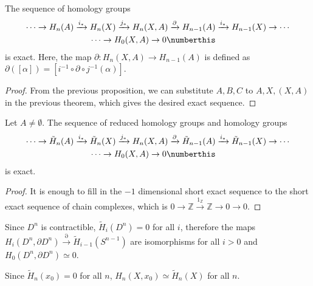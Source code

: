 \begin{cor} The sequence of homology groups
\begin{align*}
\cdots\rightarrow H_n(A)\xrightarrow{i_*} H_n(X)\xrightarrow{j_*} H_n(X,A)\xrightarrow{\partial} H_{n-1}(A)&\xrightarrow{i_*}H_{n-1}(X)\rightarrow\cdots\\
\cdots\rightarrow H_0(X,A)\rightarrow 0\numberthis
\end{align*}
is exact. Here, the map $\partial:H_n(X,A)\rightarrow H_{n-1}(A)$ is defined as $\partial([\alpha])=[i^{-1}\circ \partial\circ j^{-1}(\alpha)]$.
\end{cor}
\begin{proof}
From the previous proposition, we can substitute $A,B,C$ to $A,X,(X,A)$ in the previous theorem, which gives the desired exact sequence.
\end{proof}

\begin{cor} Let $A\neq \emptyset$. The sequence of reduced homology groups and homology groups
\begin{align*}
\cdots\rightarrow \tilde{H}_n(A)\xrightarrow{i_*} \tilde{H}_n(X)\xrightarrow{j_*} H_n(X,A)\xrightarrow{\partial} \tilde{H}_{n-1}(A)&\xrightarrow{i_*}\tilde{H}_{n-1}(X)\rightarrow\cdots\\
\cdots\rightarrow H_0(X,A)\rightarrow 0\numberthis
\end{align*}
is exact.
\end{cor}
\begin{proof} It is enough to fill in the $-1$ dimensional short exact sequence to the short exact sequence of chain complexes, which is $0\rightarrow \mathbb{Z}\xrightarrow{1_{\mathbb{Z}}}\mathbb{Z}\rightarrow 0\rightarrow 0$.
\end{proof}

\begin{exmp} Since $D^n$ is contractible, $\tilde{H}_i(D^n)=0$ for all $i$, therefore the maps $H_i(D^n,\partial D^n)\xrightarrow{\partial}\tilde{H}_{i-1}(S^{n-1})$ are isomorphisms for all $i>0$ and $H_0(D^n,\partial D^n)\simeq 0$.
\end{exmp}

\begin{exmp} Since $\tilde{H}_n(x_0)=0$ for all $n$, $H_n(X,x_0)\simeq \tilde{H}_n(X)$ for all $n$.
\end{exmp}

